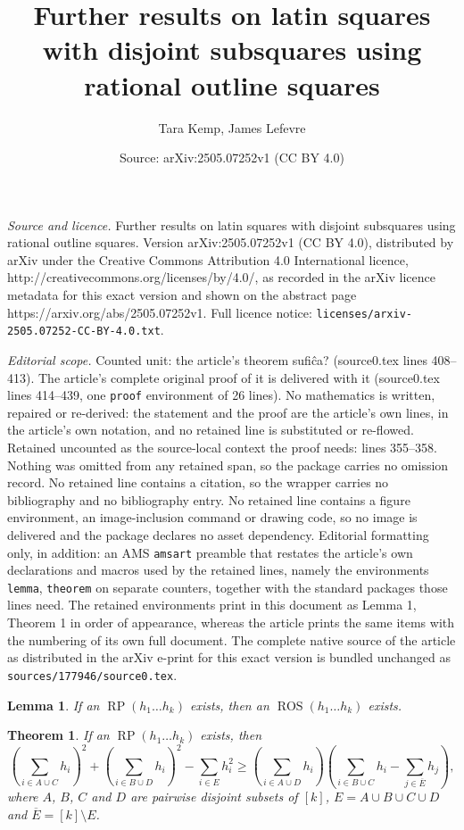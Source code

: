 \documentclass[10pt,a4paper]{amsart}
\title{Further results on latin squares with disjoint subsquares using rational outline squares}
\author{Tara Kemp, James Lefevre}
\date{Source: arXiv:2505.07252v1 (CC BY 4.0)}
\newtheorem{lemma}{Lemma}
\newtheorem{theorem}{Theorem}
\DeclareMathOperator{\LS}{RP}
\DeclareMathOperator{\ROS}{ROS}
\begin{document}
\maketitle

\noindent\emph{Source and licence.} Further results on latin squares with disjoint subsquares using rational outline squares. Version arXiv:2505.07252v1 (CC BY 4.0), distributed by arXiv under the Creative Commons Attribution 4.0 International licence, http://creativecommons.org/licenses/by/4.0/, as recorded in the arXiv licence metadata for this exact version and shown on the abstract page https://arxiv.org/abs/2505.07252v1. Full licence notice: \texttt{licenses/arxiv-2505.07252-CC-BY-4.0.txt}.\par\smallskip

\noindent\textit{Editorial scope.} Counted unit: the article's theorem sufiĉa? (source0.tex lines 408--413). The article's complete original proof of it is delivered with it (source0.tex lines 414--439, one \texttt{proof} environment of 26 lines). No mathematics is written, repaired or re-derived: the statement and the proof are the article's own lines, in the article's own notation, and no retained line is substituted or re-flowed.  Retained uncounted as the source-local context the proof needs: lines 355--358.  Nothing was omitted from any retained span, so the package carries no omission record.  No retained line contains a citation, so the wrapper carries no bibliography and no bibliography entry.  No retained line contains a figure environment, an image-inclusion command or drawing code, so no image is delivered and the package declares no asset dependency.  Editorial formatting only, in addition: an AMS \texttt{amsart} preamble that restates the article's own declarations and macros used by the retained lines, namely the environments \texttt{lemma}, \texttt{theorem} on separate counters, together with the standard packages those lines need.  The retained environments print in this document as Lemma 1, Theorem 1 in order of appearance, whereas the article prints the same items with the numbering of its own full document.  The complete native source of the article as distributed in the arXiv e-print for this exact version is bundled unchanged as \texttt{sources/177946/source0.tex}.
\begin{lemma}
\label{lemma: always symmetric solution}
    If an $\LS(h_1\dots h_k)$ exists, then an $\ROS(h_1\dots h_k)$ exists.
\end{lemma}

\begin{theorem}
\label{condition: sufiĉa?}
    If an $\LS(h_1\dots h_k)$ exists, then
    $$\left(\sum_{i\in A\cup C}h_i\right)^2 + \left(\sum_{i\in B\cup D}h_i\right)^2 - \sum_{i\in E}h_i^2 \geq \left(\sum_{i\in A\cup D}h_i\right)\left(\sum_{i\in B\cup C}h_i - \sum_{j\in \overline{E}}h_j\right),$$
    where $A$, $B$, $C$ and $D$ are pairwise disjoint subsets of $[k]$, $E = A\cup B\cup C\cup D$ and $\overline{E} = [k]\setminus E$.
\end{theorem}
\end{document}
